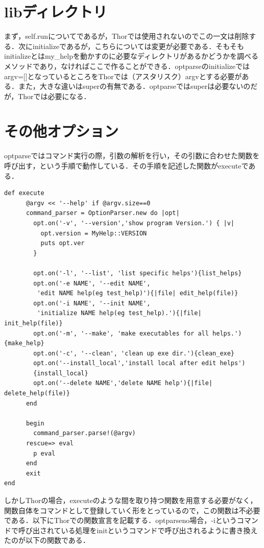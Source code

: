 \section{libディレクトリ}\label{libux30c7ux30a3ux30ecux30afux30c8ux30ea}

まず，self.runについてであるが，Thorでは使用されないのでこの一文は削除する．次にinitializeであるが，こちらについては変更が必要である．そもそもinitializeとはmy\_helpを動かすのに必要なディレクトリがあるかどうかを調べるメソッドであり，なければここで作ることができる．optparseのinitializeではargv={[}{]}となっているところをThorでは（アスタリスク）argvとする必要がある．また，大きな違いはsuperの有無である．optparseではsuperは必要ないのだが，Thorでは必要になる．

\section{その他オプション}\label{ux305dux306eux4ed6ux30aaux30d7ux30b7ux30e7ux30f3}

optparseではコマンド実行の際，引数の解析を行い，その引数に合わせた関数を呼び出す，という手順で動作している．その手順を記述した関数がexecuteである．


\begin{screen}
{\small
\begin{verbatim}
def execute
      @argv << '--help' if @argv.size==0
      command_parser = OptionParser.new do |opt|
        opt.on('-v', '--version','show program Version.') { |v|
          opt.version = MyHelp::VERSION
          puts opt.ver
        }
        
        opt.on('-l', '--list', 'list specific helps'){list_helps}
        opt.on('-e NAME', '--edit NAME',
         'edit NAME help(eg test_help)'){|file| edit_help(file)}
        opt.on('-i NAME', '--init NAME',
         'initialize NAME help(eg test_help).'){|file| init_help(file)}
        opt.on('-m', '--make', 'make executables for all helps.'){make_help}
        opt.on('-c', '--clean', 'clean up exe dir.'){clean_exe}
        opt.on('--install_local','install local after edit helps')
        {install_local}
        opt.on('--delete NAME','delete NAME help'){|file| delete_help(file)}
      end
      
      begin
        command_parser.parse!(@argv)
      rescue=> eval
        p eval
      end
      exit
end
\end{verbatim}}
\end{screen}

しかしThorの場合，executeのような間を取り持つ関数を用意する必要がなく，関数自体をコマンドとして登録していく形をとっているので，この関数は不必要である．以下にThorでの関数宣言を記載する．optparseno場合，-iというコマンドで呼び出されている処理をinitというコマンドで呼び出されるように書き換えたのが以下の関数である．


